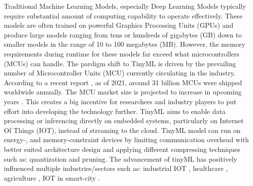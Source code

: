 \documentclass[twocolumn]{article}
\begin{document}
Traditional Machine Learning Models, especially Deep Learning Models typically require substantial amount of computing capability to operate effectively. These models are often trained on powerful Graphics Processing Units (GPUs) and produce large models ranging from tens or hundreds of gigabytes (GB) down to smaller models in the range of 10 to 100 megabytes (MB). However, the memory requirements during runtime for these models far exceed what microcontrollers (MCUs) can handle.
The pardigm shift to TinyML is driven by the prevailing number of Microcontroller Units (MCU) currently circulating in the industry. According to a recent report \cite{noauthor_microcontroller_nodate,grandviewresearch_research_2023}, as of 2021, around 31 billion MCUs were shipped worldwide annually. The MCU market size is projected to increase in upcoming years \cite{noauthor_microcontroller_nodate}. This creates a big incentive for researchers and industry players to put effort into developing the technology further.
TinyML aims to enable data processing or inferencing directly on embedded systems, particularly on Internet Of Things (IOT), instead of streaming to the cloud. TinyML model can run on energy-, and memory-constraint devices by limiting communication overhead with better suited architecture design and applying different compressing techniques such as: quantization and pruning. The advancement of tinyML has positively influenced multiple industries/sectors such as: industrial IOT \cite{ray_review_2022}, healthcare \cite{bhamare_chapter_2024}, agriculture \cite{tsoukas_tinyml-based_2022}, IOT in smart-city \cite{hussein_original_2024,ray_review_2022}. \\[0.25cm]
\end{document}
